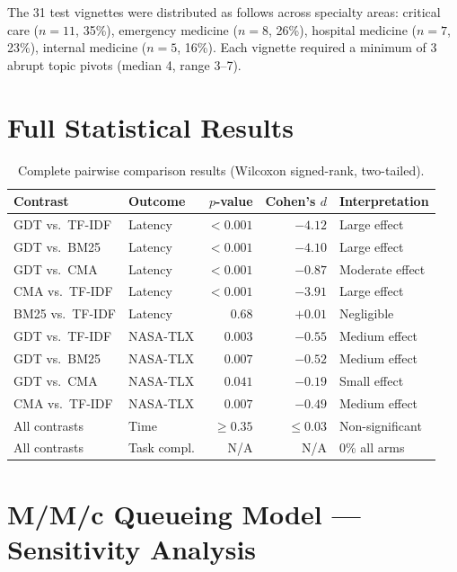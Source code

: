 \documentclass[11pt]{article}
\begin{document}
\noindent The 31 test vignettes were distributed as follows across specialty areas:
critical care ($n{=}11$, 35\%), emergency medicine ($n{=}8$, 26\%), hospital
medicine ($n{=}7$, 23\%), internal medicine ($n{=}5$, 16\%). Each vignette required
a minimum of 3 abrupt topic pivots (median 4, range 3--7).

\section{Full Statistical Results}
\label{sec:stats_full}

\begin{table}[h]
\centering
\caption{Complete pairwise comparison results (Wilcoxon signed-rank, two-tailed).}
\label{tab:stats}
\begin{tabular}{llrrl}
\toprule
\textbf{Contrast} & \textbf{Outcome} & \textbf{$p$-value} & \textbf{Cohen's $d$} & \textbf{Interpretation} \\
\midrule
GDT vs.\ TF-IDF & Latency     & $<0.001$ & $-4.12$ & Large effect \\
GDT vs.\ BM25   & Latency     & $<0.001$ & $-4.10$ & Large effect \\
GDT vs.\ CMA    & Latency     & $<0.001$ & $-0.87$ & Moderate effect \\
CMA vs.\ TF-IDF & Latency     & $<0.001$ & $-3.91$ & Large effect \\
BM25 vs.\ TF-IDF& Latency     & $0.68$   & $+0.01$ & Negligible \\
\midrule
GDT vs.\ TF-IDF & NASA-TLX    & $0.003$  & $-0.55$ & Medium effect \\
GDT vs.\ BM25   & NASA-TLX    & $0.007$  & $-0.52$ & Medium effect \\
GDT vs.\ CMA    & NASA-TLX    & $0.041$  & $-0.19$ & Small effect \\
CMA vs.\ TF-IDF & NASA-TLX    & $0.007$  & $-0.49$ & Medium effect \\
\midrule
All contrasts    & Time        & $\geq 0.35$ & $\leq 0.03$ & Non-significant \\
All contrasts    & Task compl. & N/A      & N/A     & 0\% all arms \\
\bottomrule
\end{tabular}
\end{table}

\section{M/M/c Queueing Model --- Sensitivity Analysis}
\label{sec:queueing_supp}
\end{document}
